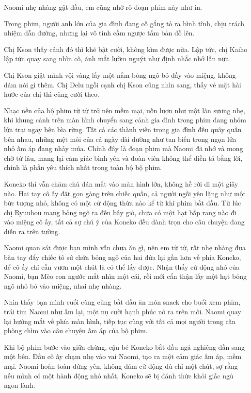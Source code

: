 \documentclass[../main.tex]{subfiles}
\begin{document}
Naomi nhẹ nhàng gật đầu, em cũng nhớ rõ đoạn phim này như in.

Trong phim, người anh lớn của gia đình đang cố gắng tỏ ra bình tĩnh, chịu trách nhiệm dẫn đường, nhưng lại vô tình cầm ngược tấm bản đồ lên.

Chị Kson thấy cảnh đó thì khẽ bật cười, không kìm được nữa. Lập tức, chị Kaiho lập tức quay sang nhìn cô, ánh mắt lườm nguýt như định nhắc nhở lần nữa.

Chị Kson giật mình vội vàng lấy một nắm bỏng ngô bỏ đầy vào miệng, không dám nói gì thêm. Chị Delu ngồi cạnh chị Kson cũng nhìn sang, thấy vẻ mặt hài hước của chị thì cũng cười theo.

Nhạc nền của bộ phim từ từ trở nên mềm mại, uốn lượn như một làn sương nhẹ, khi khung cảnh trên màn hình chuyển sang cảnh gia đình trong phim đang nhóm lửa trại ngay bên bìa rừng. Tất cả các thành viên trong gia đình đều quây quần bên nhau, những mệt mỏi của cả ngày dài dường như tan biến trong ngọn lửa nhỏ ấm áp đang nhảy múa. Chính đây là đoạn phim mà Naomi đã nhớ và mong chờ từ lâu, mang lại cảm giác bình yên và đoàn viên không thể diễn tả bằng lời, chính là phần yêu thích nhất trong toàn bộ bộ phim.

Koneko thì vẫn chăm chú dán mắt vào màn hình lớn, không hề rời đi một giây nào. Hai tay cô ấy đặt gọn gàng trên chiếc quần, cả người ngồi yên lặng như một bức tượng nhỏ, không có một cử động thừa nào kể từ khi phim bắt đầu. Từ lúc chị Ryuuhou mang bỏng ngô ra đến bây giờ, chưa có một hạt bắp rang nào đi vào miệng cô ấy, tất cả sự chú ý của Koneko đều dành trọn cho câu chuyện đang diễn ra trên tường.

Naomi quan sát được bạn mình vẫn chưa ăn gì, nên em từ từ, rất nhẹ nhàng đưa bàn tay đẩy chiếc tô sứ chứa bỏng ngô của hai đứa lại gần hơn về phía Koneko, để cô ấy chỉ cần vươn một chút là có thể lấy được. Nhận thấy cử động nhỏ của Naomi, bạn Mèo con ngước mắt nhìn một cái, rồi mới cẩn thận lấy một hạt bỏng ngô nhỏ bỏ vào miệng, nhai nhẹ nhàng.

Nhìn thấy bạn mình cuối cùng cũng bắt đầu ăn món snack cho buổi xem phim, trái tim Naomi như ấm lại, một nụ cười hạnh phúc nở ra trên môi. Naomi quay lại hướng mắt về phía màn hình, tiếp tục cùng với tất cả mọi người trong căn phòng chìm vào câu chuyện ấm áp của bộ phim.

\ct

Khi bộ phim bước vào giữa chừng, cậu bé Koneko bắt đầu ngả nghiêng dần sang một bên. Đầu cô ấy chạm nhẹ vào vai Naomi, tạo ra một cảm giác ấm áp, mềm mại. Naomi hoàn toàn đứng yên, không dám cử động dù chỉ một chút, sợ rằng nếu mình có một hành động nhỏ nhất, Koneko sẽ bị đánh thức khỏi giấc ngủ ngon lành.
\end{document}
